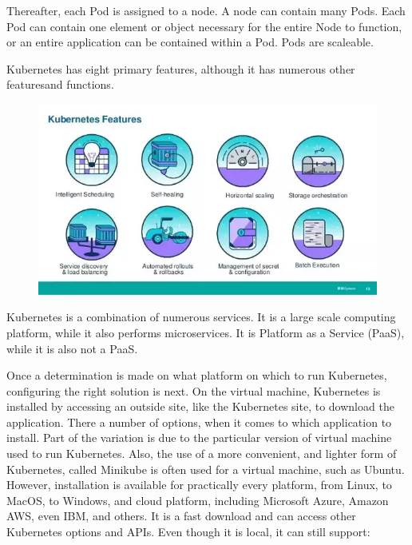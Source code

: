 Thereafter, each Pod is assigned to a node.  A node can contain many
Pods.  Each Pod can contain one element or object necessary for the
entire Node to function, or an entire application can be contained
within a Pod.  Pods are scaleable.  

Kubernetes has eight primary features, although it has numerous other 
featuresand functions.

\begin{figure}[!ht]
\includegraphics[width=\columnwidth]{images/features1.png}
\end{figure}

Kubernetes is a combination of numerous services.  It is a large scale
computing platform, while it also performs microservices.  It is
Platform as a Service (PaaS), while it is also not a PaaS. 

Once a determination is made on what platform on which to run
Kubernetes, configuring the right solution is next.  On the virtual 
machine, Kubernetes is installed by accessing an
outside site, like the Kubernetes site, to download the application.  There a
number of options, when it comes to which application to install.
Part of the variation is due to the particular version of virtual
machine used to run Kubernetes.  Also, the use of a more convenient,
and lighter form of Kubernetes, called Minikube is often used for a
virtual machine, such as Ubuntu\cite{minikube}. However, installation
is available for practically every platform, from Linux, to MacOS, to
Windows, and cloud platform, including Microsoft Azure, Amazon AWS,
even IBM, and others\cite{concept}.
It is a fast download and can access other Kubernetes options and
APIs.  Even though it is local, it can still
support\cite{concept}:

